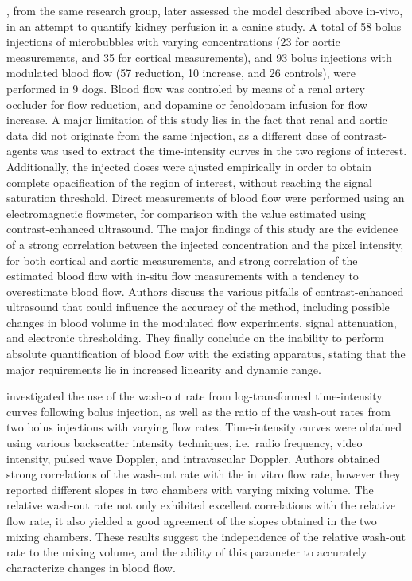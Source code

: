 \citet{Aronson:1993wsa}, from the same research group, later assessed the model described above in-vivo, in an attempt to quantify kidney perfusion in a canine study. 
A total of 58 bolus injections of microbubbles with varying concentrations (23 for aortic measurements, and 35 for cortical measurements), and 93 bolus injections with modulated blood flow (57 reduction, 10 increase, and 26 controls), were performed in 9 dogs.
Blood flow was controled by means of a renal artery occluder for flow reduction, and dopamine or fenoldopam infusion for flow increase. 
A major limitation of this study lies in the fact that renal and aortic data did not originate from the same injection, as a different dose of contrast-agents was used to extract the time-intensity curves in the two regions of interest.
Additionally, the injected doses were ajusted empirically in order to obtain complete opacification of the region of interest, without reaching the signal saturation threshold.
Direct measurements of blood flow were performed using an electromagnetic flowmeter, for comparison with the value estimated using contrast-enhanced ultrasound.
The major findings of this study are the evidence of a strong correlation between the injected concentration and the pixel intensity, for both cortical and aortic measurements, and strong correlation of the estimated blood flow with in-situ flow measurements with a tendency to overestimate blood flow. 
Authors discuss the various pitfalls of contrast-enhanced ultrasound that could influence the accuracy of the method, including possible changes in blood volume in the modulated flow experiments, signal attenuation, and electronic thresholding.
They finally conclude on the inability to perform absolute quantification of blood flow with the existing apparatus, stating that the major requirements lie in increased linearity and dynamic range.

\citet{Schwarz:1993wp} investigated the use of the wash-out rate from log-transformed time-intensity curves following bolus injection, as well as the ratio of the wash-out rates from two bolus injections with varying flow rates. 
Time-intensity curves were obtained using various backscatter intensity techniques, i.e.~radio frequency, video intensity, pulsed wave Doppler, and intravascular Doppler.
Authors obtained strong correlations of the wash-out rate with the in vitro flow rate, however they reported different slopes in two chambers with varying mixing volume.
The relative wash-out rate not only exhibited excellent correlations with the relative flow rate, it also yielded a good agreement of the slopes obtained in the two mixing chambers.
These results suggest the independence of the relative wash-out rate to the mixing volume, and the ability of this parameter to accurately characterize changes in blood flow.

